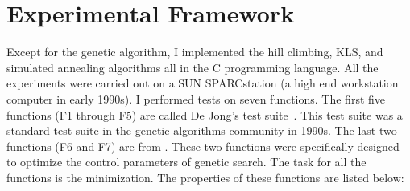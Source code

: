 \documentclass{article}
\begin{document}
\section{Experimental Framework}
\label{sec:exper}

Except for the genetic algorithm, I implemented the hill climbing,
KLS, and simulated annealing algorithms all in the C programming
language. All the experiments were carried out on a SUN SPARCstation
(a high end workstation computer in early 1990s).  I performed tests
on seven functions. The first five functions (F1 through F5) are
called De Jong’s test suite~\cite{Ac89,De75}. This test suite was a
standard test suite in the genetic algorithms community in 1990s.  The
last two functions (F6 and F7) are from \cite{ScCaEs89}. These two
functions were specifically designed to optimize the control
parameters of genetic search. The task for all the functions is the
minimization. The properties of these functions are listed below:
\end{document}
